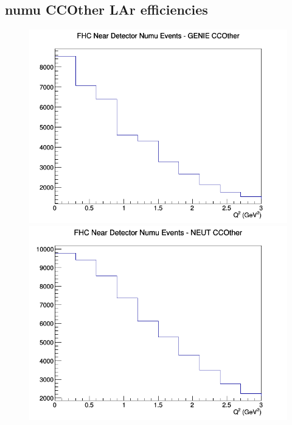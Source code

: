 \documentclass[12pt]{article}
\begin{document}
\subsection{numu CCOther LAr efficiencies}
\begin{figure}[h]
\includegraphics[width=\linewidth]{eff_Q2/LAr/CCOther_FHC_ND_numu_Q2_GENIE.png}
\endminipage
{}
\includegraphics[width=\linewidth]{eff_Q2/LAr/CCOther_FHC_ND_numu_Q2_NEUT.png}
\endminipage
{}

\end{figure}
\end{document}
